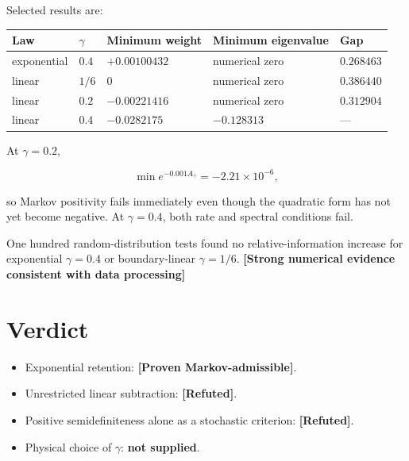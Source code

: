 \documentclass[11pt,a4paper,openany]{report}
\newcommand{\statusRefuted}{\textcolor{finred}{[Refuted]}}
\begin{document}
Selected results are:

\begin{center}
\begingroup\footnotesize
\setlength{\tabcolsep}{3.5pt}
\renewcommand{\arraystretch}{1.16}
\begin{longtable}{@{}p{}p{}p{}p{}p{}@{}}
\toprule
\textbf{Law} & \textbf{\(\gamma\)} & \textbf{Minimum weight} & \textbf{Minimum eigenvalue} & \textbf{Gap} \\
\midrule
\endhead
exponential & \(0.4\) & \(+0.00100432\) & numerical zero & \(0.268463\) \\
linear & \(1/6\) & \(0\) & numerical zero & \(0.386440\) \\
linear & \(0.2\) & \(-0.00221416\) & numerical zero & \(0.312904\) \\
linear & \(0.4\) & \(-0.0282175\) & \(-0.128313\) & — \\
\bottomrule
\end{longtable}
\endgroup
\end{center}

At \(\gamma=0.2\),

\[
\min e^{-0.001A_\gamma}=-2.21\times10^{-6},
\]

so Markov positivity fails immediately even though the quadratic form has not yet become negative. At \(\gamma=0.4\), both rate and spectral conditions fail.

One hundred random-distribution tests found no relative-information increase for exponential \(\gamma=0.4\) or boundary-linear \(\gamma=1/6\). \textbf{[Strong numerical evidence consistent with data processing]}

\section{Verdict}

\begin{itemize}
\item 
Exponential retention: \textbf{[Proven Markov-admissible]}.

\item 
Unrestricted linear subtraction: \textbf{\statusRefuted{}}.

\item 
Positive semidefiniteness alone as a stochastic criterion: \textbf{\statusRefuted{}}.

\item 
Physical choice of \(\gamma\): \textbf{not supplied}.

\end{itemize}
\end{document}
